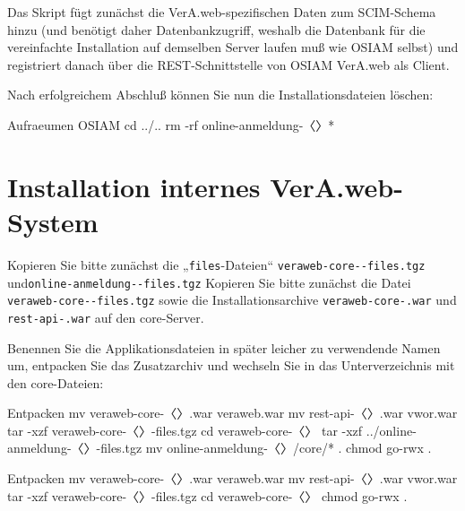 Das Skript fügt zunächst die VerA.web-spezifischen Daten
zum SCIM-Schema hinzu (und benötigt daher Datenbankzugriff,
weshalb die Datenbank für die vereinfachte Installation
auf demselben Server laufen muß wie OSIAM selbst) und
registriert danach über die REST-Schnittstelle von OSIAM
VerA.web als Client.

\begin{minipage}{\linewidth}
Nach erfolgreichem Abschluß können Sie nun die
Installationsdateien löschen:

\begin{lstdump}{Aufraeumen OSIAM}
cd ../..
rm -rf online-anmeldung-〈\lstdumpesc{\vwiaverssw}〉*
\end{lstdump}
\end{minipage}

\fi%

\section{Installation internes VerA.web-System}\label{sec:setup-int}

\ifoa
Kopieren Sie bitte zunächst die „\texttt{files}-Dateien“
\texttt{veraweb-core-\vwiaverssw{}-files.tgz} und\linebreak[1]
\texttt{online-anmeldung-\vwiaverssw{}-files.tgz}
\else%
Kopieren Sie bitte zunächst die Datei
\texttt{veraweb-core-\vwiaverssw{}-files.tgz}
\fi%
sowie die
Installationsarchive \texttt{veraweb-core-\vwiaverssw{}.war}
und \texttt{rest-api-\vwiaverssw{}.war} auf den core-Server.

\begin{minipage}{\linewidth}
Benennen Sie die Applikationsdateien in später leicher zu
verwendende Namen um, entpacken Sie das Zusatzarchiv und
wechseln Sie in das Unterverzeichnis mit den core-Dateien:

\ifoa
\begin{lstdump}{Entpacken}
mv veraweb-core-〈\lstdumpesc{\vwiaverssw}〉.war veraweb.war
mv rest-api-〈\lstdumpesc{\vwiaverssw}〉.war vwor.war
tar -xzf veraweb-core-〈\lstdumpesc{\vwiaverssw}〉-files.tgz
cd veraweb-core-〈\lstdumpesc{\vwiaverssw}〉
tar -xzf ../online-anmeldung-〈\lstdumpesc{\vwiaverssw}〉-files.tgz
mv online-anmeldung-〈\lstdumpesc{\vwiaverssw}〉/core/* .
chmod go-rwx .
\end{lstdump}
\else%
\begin{lstdump}{Entpacken}
mv veraweb-core-〈\lstdumpesc{\vwiaverssw}〉.war veraweb.war
mv rest-api-〈\lstdumpesc{\vwiaverssw}〉.war vwor.war
tar -xzf veraweb-core-〈\lstdumpesc{\vwiaverssw}〉-files.tgz
cd veraweb-core-〈\lstdumpesc{\vwiaverssw}〉
chmod go-rwx .
\end{lstdump}
\fi%
\end{minipage}

